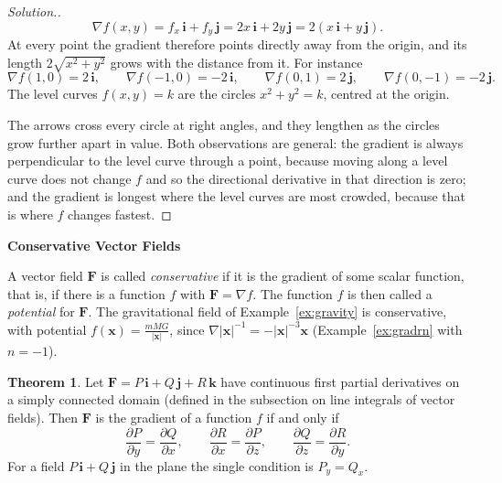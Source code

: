 \documentclass[11pt,a4paper]{article}
\theoremstyle{definition}
\newtheorem{thm}{Theorem}[subsection]
\newenvironment{solution}
  {\renewcommand{\qedsymbol}{}\begin{proof}[\textit{Solution}.]}
  {\end{proof}}
\newcommand{\subhead}[1]{%
  \par\medskip\noindent\textbf{#1}\par\nobreak\smallskip}
\begin{document}
\begin{solution}
\[\nabla f(x,y) = f_x\,\mathbf i + f_y\,\mathbf j = 2x\,\mathbf i + 2y\,\mathbf
j = 2(x\,\mathbf i + y\,\mathbf j).\]
At every point the gradient therefore points directly away from the origin, and
its length $2\sqrt{x^2+y^2}$ grows with the distance from it. For instance
\[\nabla f(1,0) = 2\,\mathbf i,\qquad \nabla f(-1,0)= -2\,\mathbf i,\qquad
\nabla f(0,1) = 2\,\mathbf j,\qquad \nabla f(0,-1) = -2\,\mathbf j.\]
The level curves $f(x,y) = k$ are the circles $x^2+y^2 = k$, centred at the
origin.

\begin{figure}[H]
\centering
{}
\end{figure}

The arrows cross every circle at right angles, and they lengthen as the circles
grow further apart in value. Both observations are general: the gradient is
always perpendicular to the level curve through a point, because moving along a
level curve does not change $f$ and so the directional derivative in that
direction is zero; and the gradient is longest where the level curves are most
crowded, because that is where $f$ changes fastest.
\end{solution}

\subhead{Conservative Vector Fields}

A vector field $\mathbf F$ is called \emph{conservative} if it is the gradient
of some scalar function, that is, if there is a function $f$ with
$\mathbf F = \nabla f$. The function $f$ is then called a \emph{potential} for
$\mathbf F$. The gravitational field of Example~\ref{ex:gravity} is
conservative, with potential $f(\mathbf x) = \frac{mMG}{|\mathbf x|}$, since
$\nabla |\mathbf x|^{-1} = -|\mathbf x|^{-3}\mathbf x$ (Example~\ref{ex:gradrn}
with $n = -1$).

\begin{thm}
\label{thm:conservativetest}
Let $\mathbf F = P\,\mathbf i + Q\,\mathbf j + R\,\mathbf k$ have continuous
first partial derivatives on a simply connected domain (defined in the
subsection on line integrals of vector fields). Then $\mathbf F$ is the gradient
of a function $f$ if and only if
\[\frac{\partial P}{\partial y} = \frac{\partial Q}{\partial x} ,\qquad
\frac{\partial R}{\partial x} = \frac{\partial P}{\partial z} ,\qquad
\frac{\partial Q}{\partial z}= \frac{\partial R}{\partial y} .\]
For a field $P\,\mathbf i + Q\,\mathbf j$ in the plane the single condition is
$P_y = Q_x$.
\end{thm}
\end{document}
